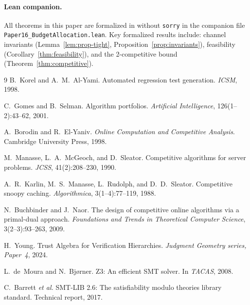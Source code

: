 \documentclass[11pt]{article}
\begin{document}
\paragraph{Lean companion.}
All theorems in this paper are formalized in \LEAN{} without
\texttt{sorry} in the companion file
\texttt{Paper16\_BudgetAllocation.lean}.  Key formalized results
include: channel invariants (Lemma~\ref{lem:prop-tight},
Proposition~\ref{prop:invariants}), feasibility
(Corollary~\ref{thm:feasibility}), and the
2-competitive bound (Theorem~\ref{thm:competitive}).

\begin{thebibliography}{9}
  B.~Korel and A.~M.~Al-Yami.
  \newblock Automated regression test generation.
  \newblock \textit{ICSM}, 1998.

  C.~Gomes and B.~Selman.
  \newblock Algorithm portfolios.
  \newblock \textit{Artificial Intelligence}, 126(1--2):43--62, 2001.

  A.~Borodin and R.~El-Yaniv.
  \newblock \textit{Online Computation and Competitive Analysis}.
  \newblock Cambridge University Press, 1998.

  M.~Manasse, L.~A.~McGeoch, and D.~Sleator.
  \newblock Competitive algorithms for server problems.
  \newblock \textit{JCSS}, 41(2):208--230, 1990.

  A.~R.~Karlin, M.~S.~Manasse, L.~Rudolph, and D.~D.~Sleator.
  \newblock Competitive snoopy caching.
  \newblock \textit{Algorithmica}, 3(1--4):77--119, 1988.

  N.~Buchbinder and J.~Naor.
  \newblock The design of competitive online algorithms via a primal-dual
  approach.
  \newblock \textit{Foundations and Trends in Theoretical Computer Science},
  3(2--3):93--263, 2009.

  H.~Young.
  \newblock Trust Algebra for Verification Hierarchies.
  \newblock \textit{Judgment Geometry series, Paper~4}, 2024.

  L.~de~Moura and N.~Bj{\o}rner.
  \newblock Z3: An efficient SMT solver.
  \newblock In \textit{TACAS}, 2008.

  C.~Barrett \textit{et al.}
  \newblock SMT-LIB 2.6: The satisfiability modulo theories library standard.
  \newblock Technical report, 2017.
\end{thebibliography}
\end{document}

